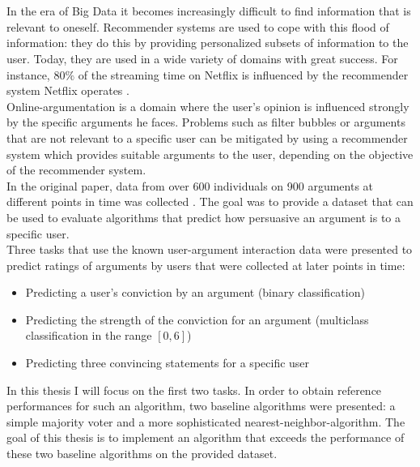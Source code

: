 \setlength{\parindent}{0pt}

\section*{}
In the era of Big Data it becomes increasingly difficult to find information that is relevant to oneself. 
Recommender systems are used to cope with this flood of information: 
they do this by providing personalized subsets of information to the user. 
Today, they are used in a wide variety of domains with great success. For instance, $80\%$ of the
streaming time on Netflix is influenced by the recommender system Netflix operates \cite{gomez2015netflix}. 
\\

Online-argumentation is a domain where the user's opinion is influenced strongly by the
specific arguments he faces. Problems such as filter bubbles or arguments that
are not relevant to a specific user can be mitigated by using a recommender system
which provides suitable arguments to the user, depending on the objective of the recommender system.\\
In the original paper, data from over 600 individuals on 900 arguments at different points in time was collected \cite{HowIArgue}.
The goal was to provide a dataset that can be used to evaluate algorithms that predict how persuasive 
an argument is to a specific user.\\
Three tasks that use the known user-argument interaction data were presented to predict ratings of arguments 
by users that were collected at later points in time:
\begin{itemize}
    \item Predicting a user's conviction by an argument (binary classification)
    \item Predicting the strength of the conviction for an argument (multiclass classification in the range $[0,6]$)
    \item Predicting three convincing statements for a specific user
\end{itemize}
In this thesis I will focus on the first two tasks.
In order to obtain reference performances for such an algorithm, two baseline algorithms
were presented: a simple majority voter and a more sophisticated nearest-neighbor-algorithm.
The goal of this thesis is to implement an algorithm that exceeds the performance of these two 
baseline algorithms on the provided dataset.
\\

